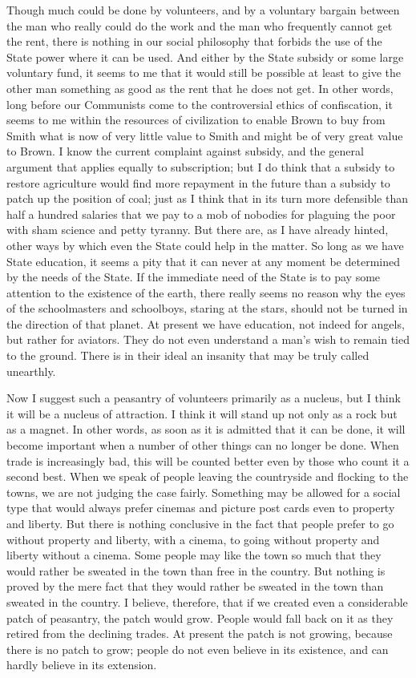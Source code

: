 \documentclass{book}
\begin{document}
Though much could be done by volunteers, and by a voluntary bargain between the man who really could do the work and the man who frequently cannot get the rent, there is nothing in our social philosophy that forbids the use of the State power where it can be used. And either by the State subsidy or some large voluntary fund, it seems to me that it would still be possible at least to give the other man something as good as the rent that he does not get. In other words, long before our Communists come to the controversial ethics of confiscation, it seems to me within the resources of civilization to enable Brown to buy from Smith what is now of very little value to Smith and might be of very great value to Brown. I know the current complaint against subsidy, and the general argument that applies equally to subscription; but I do think that a subsidy to restore agriculture would find more repayment in the future than a subsidy to patch up the position of coal; just as I think that in its turn more defensible than half a hundred salaries that we pay to a mob of nobodies for plaguing the poor with sham science and petty tyranny. But there are, as I have already hinted, other ways by which even the State could help in the matter. So long as we have State education, it seems a pity that it can never at any moment be determined by the needs of the State. If the immediate need of the State is to pay some attention to the existence of the earth, there really seems no reason why the eyes of the schoolmasters and schoolboys, staring at the stars, should not be turned in the direction of that planet. At present we have education, not indeed for angels, but rather for aviators. They do not even understand a man’s wish to remain tied to the ground. There is in their ideal an insanity that may be truly called unearthly.

Now I suggest such a peasantry of volunteers primarily as a nucleus, but I think it will be a nucleus of attraction. I think it will stand up not only as a rock but as a magnet. In other words, as soon as it is admitted that it can be done, it will become important when a number of other things can no longer be done. When trade is increasingly bad, this will be counted better even by those who count it a second best. When we speak of people leaving the countryside and flocking to the towns, we are not judging the case fairly. Something may be allowed for a social type that would always prefer cinemas and picture post cards even to property and liberty. But there is nothing conclusive in the fact that people prefer to go without property and liberty, with a cinema, to going without property and liberty without a cinema. Some people may like the town so much that they would rather be sweated in the town than free in the country. But nothing is proved by the mere fact that they would rather be sweated in the town than sweated in the country. I believe, therefore, that if we created even a considerable patch of peasantry, the patch would grow. People would fall back on it as they retired from the declining trades. At present the patch is not growing, because there is no patch to grow; people do not even believe in its existence, and can hardly believe in its extension.
\end{document}
